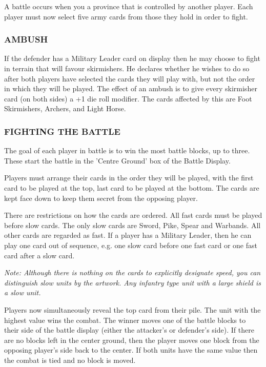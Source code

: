 A battle occurs when you a province that is controlled by another player. Each player must now select five army cards from those they hold in order to fight.

\subsubsection{AMBUSH}

If the defender has a Military Leader card on display then he may choose to fight in terrain that will favour skirmishers. He declares whether he wishes to do so after both players have selected the cards they will play with, but not the order in which they will be played. The effect of an ambush is to give every skirmisher card (on both sides) a +1 die roll modifier. The cards affected by this are Foot Skirmishers, Archers, and Light Horse.

\subsubsection{FIGHTING THE BATTLE}

The goal of each player in battle is to win the most battle blocks, up to three. These start the battle in the 'Centre Ground’ box of  the Battle Display.

Players must arrange their cards in the order they will be played, with the first card to be played at the top, last card to be played at the bottom. The cards are kept face down to keep them secret from the opposing player.

There are restrictions on how the cards are ordered. All fast cards must be played before slow cards. The only slow cards are Sword, Pike, Spear and Warbands. All other cards are regarded as fast. If a player has a Military Leader, then he can play one card out of sequence, e.g. one slow card before one fast card or one fast card after a slow card.

\textit{Note: Although there is nothing on the cards to explicitly designate speed, you can distinguish slow units by the artwork. Any infantry type unit with a large shield is a slow unit.}

Players now simultaneously reveal the top card from their pile. The unit with the highest value wins the combat. The winner moves one of the battle blocks to their side of the battle display (either the attacker's or defender's side). If there are no blocks left in the center ground, then the player moves one block from the opposing player's side back to the center. If both units have the same value then the combat is tied and no block is moved.

